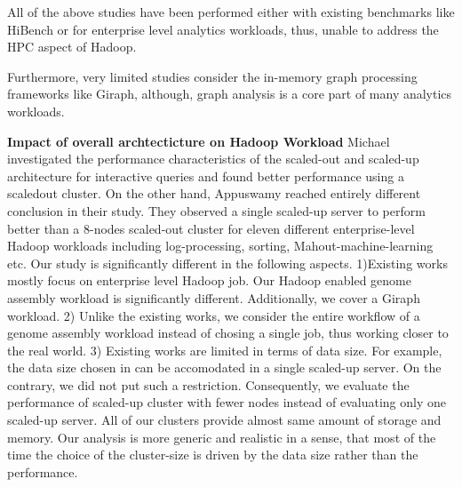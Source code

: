 \documentclass[conference]{IEEEtran}
\begin{document}
All of the above studies have been performed either with existing benchmarks like HiBench \cite{bm:hibench} or for enterprise level analytics workloads, thus, unable to address the HPC aspect of Hadoop.

Furthermore, very limited studies consider the in-memory graph processing frameworks like Giraph, although, graph analysis is a core part of many analytics workloads.

\textbf{Impact of overall archtecticture on Hadoop Workload}
Michael \cite{scaleupscaleout:michael} investigated the performance characteristics of the scaled-out and scaled-up architecture for interactive queries and found better performance using a scaledout cluster.
On the other hand, Appuswamy \cite{scaleupscaleout:appuswamy} reached entirely different conclusion in their study. 
They observed a single scaled-up server to perform better than a 8-nodes scaled-out cluster for eleven different enterprise-level Hadoop workloads including log-processing, sorting, Mahout-machine-learning etc.
Our study is significantly different in the following aspects.
1)Existing works mostly focus on enterprise level Hadoop job. Our Hadoop enabled genome assembly workload is significantly different. Additionally, we cover a Giraph workload.
2) Unlike the existing works, we consider the entire workflow of a genome assembly workload instead of chosing a single job, thus working closer to the real world. 
3) Existing works are limited in terms of data size. For example, the data size chosen in \cite{scaleupscaleout:appuswamy} can be accomodated in a single scaled-up server. On the contrary, we did not put such a restriction. Consequently, we evaluate the performance of scaled-up cluster with fewer nodes instead of evaluating only one scaled-up server. All of our clusters provide almost same amount of storage and memory. Our analysis is more generic and realistic in a sense, that most of the time the choice of the cluster-size is driven by the data size rather than the performance.


\end{document}

